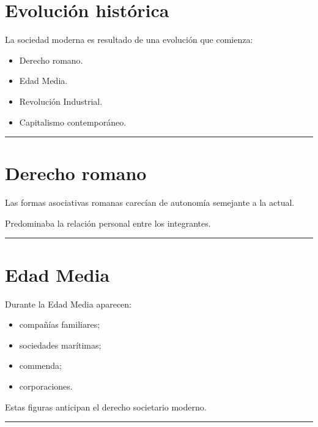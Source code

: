 \documentclass[
  spanish,
  letterpaper,
  DIV=11,
  numbers=noendperiod]{scrartcl}
\providecommand{\tightlist}{%
  \setlength{\itemsep}{0pt}\setlength{\parskip}{0pt}}
\begin{document}
\section{Evolución histórica}\label{evoluciuxf3n-histuxf3rica}

La sociedad moderna es resultado de una evolución que comienza:

\begin{itemize}
\tightlist
\item
  Derecho romano.
\item
  Edad Media.
\item
  Revolución Industrial.
\item
  Capitalismo contemporáneo.
\end{itemize}

\begin{center}\rule{0.5\linewidth}{0.5pt}\end{center}

\section{Derecho romano}\label{derecho-romano}

Las formas asociativas romanas carecían de autonomía semejante a la
actual.

Predominaba la relación personal entre los integrantes.

\begin{center}\rule{0.5\linewidth}{0.5pt}\end{center}

\section{Edad Media}\label{edad-media}

Durante la Edad Media aparecen:

\begin{itemize}
\tightlist
\item
  compañías familiares;
\item
  sociedades marítimas;
\item
  commenda;
\item
  corporaciones.
\end{itemize}

Estas figuras anticipan el derecho societario moderno.

\begin{center}\rule{0.5\linewidth}{0.5pt}\end{center}
\end{document}
